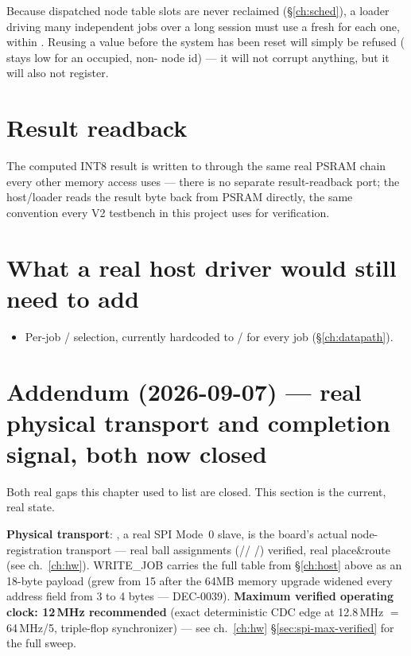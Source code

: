 \begin{fnnote}
Because dispatched node table slots are never reclaimed
(\S\ref{ch:sched}), a loader driving many independent jobs over a long
session must use a fresh  for each one, within
. Reusing a value before the system has been reset will
simply be refused ( stays low for an occupied,
non- node id) --- it will not corrupt anything, but it will
also not register.
\end{fnnote}

\section{Result readback}
The computed INT8 result is written to  through
the same real PSRAM chain every other memory access uses --- there is no
separate result-readback port; the host/loader reads the result byte
back from PSRAM directly, the same convention every V2 testbench in this
project uses for verification.

\section{What a real host driver would still need to add}
\begin{itemize}
\item Per-job / selection, currently
      hardcoded to / for every job
      (\S\ref{ch:datapath}).
\end{itemize}

\section{Addendum (2026-09-07) --- real physical transport and
completion signal, both now closed}
\label{sec:host-addendum}
\begin{fnwarn}
Both real gaps this chapter used to list are closed. This section is
the current, real state.
\end{fnwarn}

\textbf{Physical transport}: , a real SPI
Mode~0 slave, is the board's actual node-registration transport ---
real ball assignments (//
/) verified, real place\&route (see
ch.~\ref{ch:hw}). WRITE\_JOB carries the full table from
\S\ref{ch:host} above as an 18-byte payload (grew from 15 after the
64MB memory upgrade widened every address field from 3 to 4 bytes ---
 DEC-0039). \textbf{Maximum verified operating
clock: 12\,MHz recommended} (exact deterministic CDC edge at
12.8\,MHz $=$ 64\,MHz/5, triple-flop synchronizer) --- see
ch.~\ref{ch:hw} \S\ref{sec:spi-max-verified} for the full sweep.

